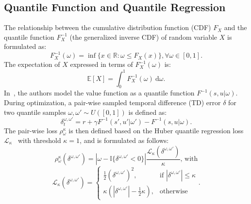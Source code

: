 \documentclass{article}
\newcommand{\state}{s}
\newcommand{\timestep}{t}
\newcommand{\action}{u}
\newcommand{\reward}{r}
\newcommand{\tderror}{\delta}
\newcommand{\huberloss}{\mathcal{L}_\kappa}
\newcommand{\asymmetrichuberloss}{\rho}
\newcommand{\quantilefunction}{F^{-1}}
\newcommand{\quantile}{\omega}
\newcommand{\cdf}{F}
\begin{document}
\subsection{Quantile Function and Quantile Regression}
\label{subsec:background_quantile_function_and_quantile_regression}

The relationship between the cumulative distribution function (CDF) $F_X$ and the quantile function $\quantilefunction_X$ (the generalized inverse CDF) of random variable $X$ is formulated as:
\begin{equation}
\quantilefunction_X(\quantile{})=\inf\{x\in\mathbb{R}:\quantile{}\le \cdf{}_X(x)\}, \forall\quantile\in[0,1].
\label{eq:quantile_function_to_inverse_cdf}
\end{equation}
The expectation of $X$ expressed in terms of $\quantilefunction_X(\quantile{})$ is:
\begin{equation}
\mathbb{E}[X]=\int_0^1\quantilefunction_X(\quantile{})\ \mathrm{d}\quantile.
\label{eq:expectation_of_quantile_function}
\end{equation}
In~\cite{Dabney2018QR-DQN}, the authors model the value function as a quantile function $\quantilefunction{}(\state{},\action{}\vert\quantile{})$. During optimization, a pair-wise sampled temporal difference (TD) error $\tderror$ for two quantile samples $\quantile{}, \quantile{}'\sim U([0,1])$ is defined as:
\begin{equation}
\tderror_{\timestep{}}^{\quantile{},\quantile{}'}=\reward{}+\gamma \quantilefunction{}(\state{}',\action{}'\vert\quantile{}') - \quantilefunction{}(\state{},\action{}\vert\quantile{}).
\end{equation}
The pair-wise loss $\asymmetrichuberloss{}^\kappa_{\quantile{}}$ is then defined based on the Huber quantile regression loss $\huberloss{}$~\cite{Dabney2018QR-DQN} with threshold $\kappa=1$, and is formulated as follows:
\begin{equation}
\asymmetrichuberloss{}^\kappa_{\quantile{}}(\tderror^{\quantile{},\quantile{}'})=|\quantile{}-\mathbb{I}\{\tderror^{\quantile{},\quantile{}'}<0\}|\frac{\huberloss{}(\tderror^{\quantile{},\quantile{}'})}{\kappa} \text{, with}
\end{equation}
\begin{equation}
\huberloss{}(\tderror^{\quantile{},\quantile{}'})=
\begin{cases}
    \frac{1}{2}(\tderror^{\quantile{},\quantile{}'})^2, & \text{if }|\tderror^{\quantile{},\quantile{}'}|\le\kappa\\
    \kappa(|\tderror^{\quantile{},\quantile{}'}|-\frac{1}{2}\kappa), & \text{otherwise}
\end{cases}.
\end{equation}
\end{document}
